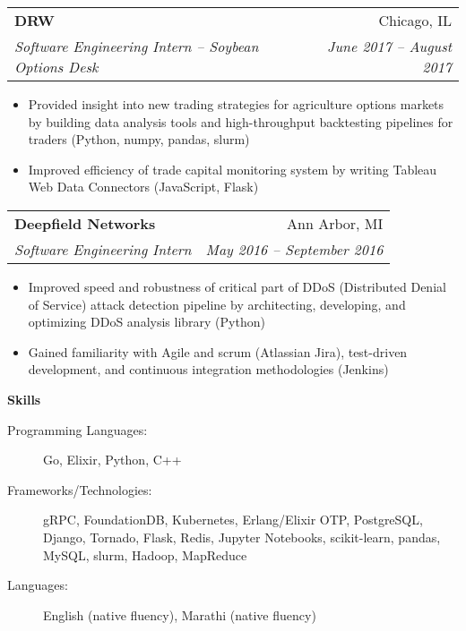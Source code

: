 \documentclass[letterpaper,11pt]{article}
\makeatletter
\newcommand{\resitem}[1]{\item #1 \vspace{-2pt}}
\newcommand{\resheading}[1]{{\large \colorbox{mygrey}{\begin{minipage}{\textwidth}{\textbf{#1 \vphantom{p\^{E}}}}\end{minipage}}}}
\newcommand{\ressubheading}[4]{
\begin{tabular*}{6.875in}{l@{\extracolsep{\fill}}r}
		\textbf{#1} & #2 \\
		\textit{#3} & \textit{#4} \\
\end{tabular*}\vspace{-6pt}}
\renewcommand{\footnotesize}{\fontsize{10pt}{11pt}\selectfont}
\makeatother
\begin{document}
\begin{description}
			\ressubheading{DRW}{Chicago, IL}
			{Software Engineering Intern -- Soybean Options Desk}{June 2017 -- August 2017}
			{	
				\footnotesize
				\begin{itemize}
					\resitem{Provided insight into new trading strategies for agriculture options markets by building data analysis tools and high-throughput backtesting pipelines for traders  (Python, numpy, pandas, slurm)}
					\resitem{Improved efficiency of trade capital monitoring system by writing Tableau Web Data Connectors  (JavaScript, Flask)}
				\end{itemize}
			}
			\item 
			\ressubheading{Deepfield Networks}{Ann Arbor, MI}
			{Software Engineering Intern}{May 2016 -- September 2016}
			{	
				\footnotesize
				\begin{itemize}
					\resitem{Improved speed and robustness of critical part of DDoS (Distributed Denial of Service) attack detection pipeline by architecting, developing, and optimizing DDoS analysis library (Python)}
					\resitem{Gained familiarity with Agile and scrum (Atlassian Jira), test-driven development, and continuous integration methodologies (Jenkins)}
				\end{itemize}
			}						
		\end{description}  %
						
		\resheading{Skills}
		\begin{description}
			\item[Programming Languages:]
			{	
				\footnotesize
				Go, Elixir, Python, C++
			}
			\item[Frameworks/Technologies:]
			{
				\footnotesize
				gRPC, FoundationDB, Kubernetes, Erlang/Elixir OTP, PostgreSQL, Django, Tornado, Flask, Redis, Jupyter Notebooks, scikit-learn, pandas, MySQL, slurm, Hadoop, MapReduce
			}
			\item[Languages:]
			{
				\footnotesize
				English (native fluency), Marathi (native fluency)
			}
		\end{description} %
						
						
\end{document}
